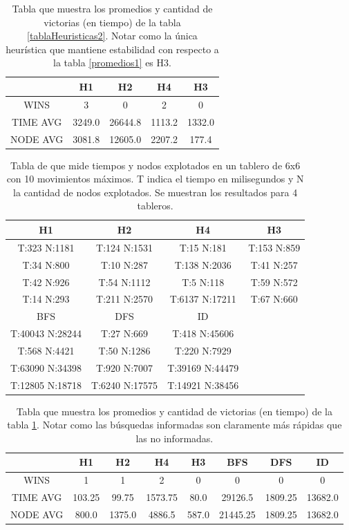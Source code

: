 \documentclass{article}
\begin{document}
\begin{table}
  \begin{tabular}{|c|c|c|c|c|}
\hline
& H1 & H2 & H4 & H3 \\
\hline
WINS & 3 & 0 & 2 & 0 \\
TIME AVG & 3249.0 & 26644.8 & 1113.2 & 1332.0 \\
NODE AVG & 3081.8 & 12605.0 & 2207.2 & 177.4 \\\hline
\end{tabular}
\centering
	\caption{Tabla que muestra los promedios y cantidad de victorias (en tiempo) de la tabla \ref{tablaHeuristicas2}. Notar como la \'unica heur\'istica que mantiene estabilidad con respecto a la tabla \ref{promedios1} es H3. }
  
\end{table}

\begin{table}
  \begin{tabular}{|c|c|c|c|}
  \hline
  H1 & H2 & H4 & H3 \\
  \hline
T:323 N:1181 & T:124 N:1531 & T:15 N:181 & T:153 N:859 \\
\hline
T:34 N:800 & T:10 N:287 & T:138 N:2036 & T:41 N:257 \\
\hline
T:42 N:926 & T:54 N:1112 & T:5 N:118 & T:59 N:572 \\
\hline
T:14 N:293 & T:211 N:2570 & T:6137 N:17211 & T:67 N:660 \\
\hline
 BFS & DFS & ID & \\
 \hline
 T:40043 N:28244 & T:27 N:669 & T:418 N:45606 &\\
 \hline
 T:568 N:4421 & T:50 N:1286 & T:220 N:7929 &\\
 \hline
 T:63090 N:34398 & T:920 N:7007 & T:39169 N:44479 & \\
 \hline
 T:12805 N:18718 & T:6240 N:17575 & T:14921 N:38456 & \\
 \hline
  \end{tabular}
  \caption{Tabla de que mide tiempos y nodos explotados en un tablero de 6x6 con 10 movimientos m\'aximos. T indica el tiempo en milisegundos y N la cantidad de nodos explotados. Se muestran los resultados para 4 tableros.}
  \label{tablaHeuristicas3}
  \centering
\end{table}

\begin{table}
  \begin{tabular}{|c|c|c|c|c|c|c|c|}
\hline
& H1 & H2 & H4 & H3 & BFS & DFS & ID \\
\hline
WINS & 1 & 1 & 2 & 0 & 0 & 0 & 0 \\
\hline
TIME AVG &  103.25 & 99.75 & 1573.75 & 80.0 & 29126.5 & 1809.25 & 13682.0 \\
\hline
NODE AVG & 800.0 & 1375.0 & 4886.5 & 587.0 & 21445.25 & 1809.25 & 13682.0 \\
\hline
\end{tabular}
\centering
	\caption{Tabla que muestra los promedios y cantidad de victorias (en tiempo) de la tabla \ref{tablaHeuristicas3}. Notar como las b\'usquedas informadas son claramente m\'as r\'apidas que las no informadas. }
  
\end{table}
\end{document}
